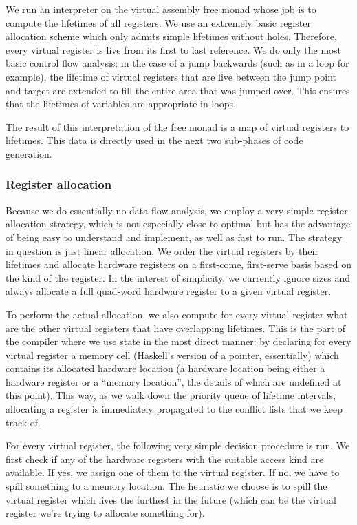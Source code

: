 \documentclass[letterpaper,11pt]{article}
\begin{document}
We run an interpreter on the virtual assembly free monad whose job is to compute the lifetimes of all registers. We use an extremely basic register allocation scheme which only admits simple lifetimes without holes. Therefore, every virtual register is live from its first to last reference. We do only the most basic control flow analysis: in the case of a jump backwards (such as in a loop for example), the lifetime of virtual registers that are live between the jump point and target are extended to fill the entire area that was jumped over. This ensures that the lifetimes of variables are appropriate in loops.

The result of this interpretation of the free monad is a map of virtual registers to lifetimes. This data is directly used in the next two sub-phases of code generation.

\subsubsection{Register allocation}

Because we do essentially no data-flow analysis, we employ a very simple register allocation strategy, which is not especially close to optimal but has the advantage of being easy to understand and implement, as well as fast to run. The strategy in question is just linear allocation. We order the virtual registers by their lifetimes and allocate hardware registers on a first-come, first-serve basis based on the kind of the register. In the interest of simplicity, we currently ignore sizes and always allocate a full quad-word hardware register to a given virtual register.

To perform the actual allocation, we also compute for every virtual register what are the other virtual registers that have overlapping lifetimes. This is the part of the compiler where we use state in the most direct manner: by declaring for every virtual register a memory cell (Haskell's version of a pointer, essentially) which contains its allocated hardware location (a hardware location being either a hardware register or a ``memory location'', the details of which are undefined at this point). This way, as we walk down the priority queue of lifetime intervals, allocating a register is immediately propagated to the conflict lists that we keep track of.

For every virtual register, the following very simple decision procedure is run. We first check if any of the hardware registers with the suitable access kind are available. If yes, we assign one of them to the virtual register. If no, we have to spill something to a memory location. The heuristic we choose is to spill the virtual register which lives the furthest in the future (which can be the virtual register we're trying to allocate something for).
\end{document}
